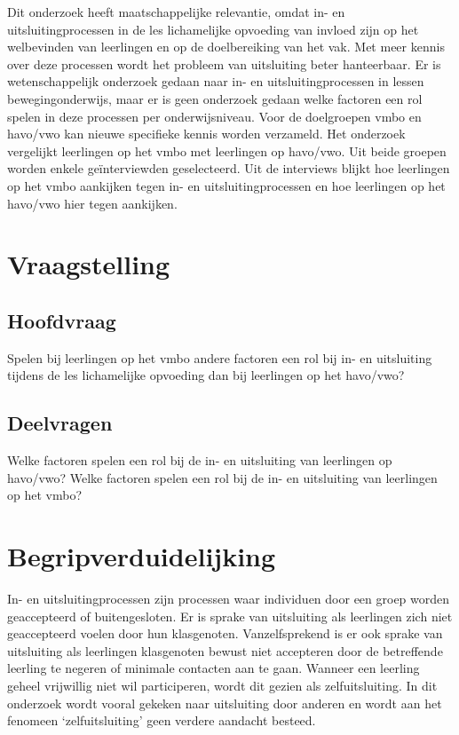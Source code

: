 \documentclass[a4paper,12pt]{memoir}
\begin{document}
Dit onderzoek heeft maatschappelijke relevantie, omdat in- en uitsluitingprocessen in de les lichamelijke opvoeding van invloed zijn op het welbevinden van leerlingen en op de doelbereiking van het vak. Met meer kennis over deze processen wordt het probleem van uitsluiting beter hanteerbaar. Er is wetenschappelijk onderzoek gedaan naar in- en uitsluitingprocessen in lessen bewegingonderwijs, maar er is geen onderzoek gedaan welke factoren een rol spelen in deze processen per onderwijsniveau. Voor de doelgroepen vmbo en havo/vwo kan nieuwe specifieke kennis worden verzameld. Het onderzoek vergelijkt leerlingen op het vmbo met leerlingen op havo/vwo. Uit beide groepen worden enkele geïnterviewden geselecteerd. Uit de interviews blijkt hoe leerlingen op het vmbo aankijken tegen in- en uitsluitingprocessen en hoe leerlingen op het havo/vwo hier tegen aankijken.

\section{Vraagstelling}

\subsection{Hoofdvraag}

\noindent Spelen bij leerlingen op het vmbo andere factoren een rol bij in- en uitsluiting tijdens de les lichamelijke opvoeding dan bij leerlingen op het havo/vwo?

\subsection{Deelvragen}

\noindent Welke factoren spelen een rol bij de in- en uitsluiting van leerlingen op havo/vwo?
\noindent Welke factoren spelen een rol bij de in- en uitsluiting van leerlingen op het vmbo?

\section{Begripverduidelijking}

In- en uitsluitingprocessen zijn processen waar individuen door een groep worden geaccepteerd of buitengesloten. Er is sprake van uitsluiting als leerlingen zich niet geaccepteerd voelen door hun klasgenoten. Vanzelfsprekend is er ook sprake van uitsluiting als leerlingen klasgenoten bewust niet accepteren door de betreffende leerling te negeren of minimale contacten aan te gaan. Wanneer een leerling geheel vrijwillig niet wil participeren, wordt dit gezien als zelfuitsluiting. In dit onderzoek wordt vooral gekeken naar uitsluiting door anderen en wordt aan het fenomeen `zelfuitsluiting' geen verdere aandacht besteed.
\end{document}
